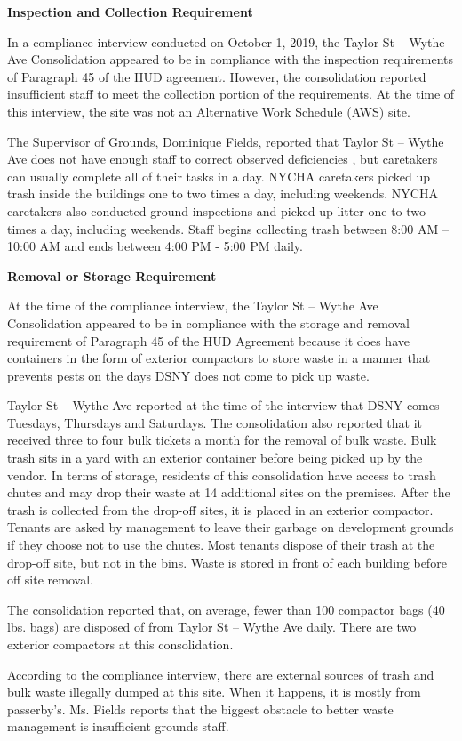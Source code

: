 

\textbf{Inspection and Collection Requirement}

In a compliance interview conducted on October 1, 2019, the Taylor St -- Wythe Ave Consolidation appeared to be in compliance with the inspection requirements of Paragraph 45 of the HUD agreement. However, the consolidation reported insufficient staff to meet the collection portion of the requirements. At the time of this interview, the site was not an Alternative Work Schedule (AWS) site. 

The Supervisor of Grounds, Dominique Fields, reported that Taylor St -- Wythe Ave does not have enough staff to correct observed deficiencies , but caretakers can usually complete all of their tasks in a day. NYCHA caretakers picked up trash inside the buildings one to two times a day, including weekends. NYCHA caretakers also conducted ground inspections and picked up litter one to two times a day, including weekends. Staff begins collecting trash between 8:00 AM -- 10:00 AM and ends between 4:00 PM - 5:00 PM daily. 

\textbf{Removal or Storage Requirement}

At the time of the compliance interview, the Taylor St -- Wythe Ave Consolidation appeared to be in compliance with the storage and removal requirement of Paragraph 45 of the HUD Agreement because it does have containers in the form of exterior compactors to store waste in a manner that prevents pests on the days DSNY does not come to pick up waste. 

Taylor St -- Wythe Ave reported at the time of the interview that DSNY comes Tuesdays, Thursdays and Saturdays. The consolidation also reported that it received three to four bulk tickets a month for the removal of bulk waste. Bulk trash sits in a yard with an exterior container before being picked up by the vendor. In terms of storage, residents of this consolidation have access to trash chutes and may drop their waste at 14 additional sites on the premises. After the trash is collected from the drop-off sites, it is placed in an exterior compactor. Tenants are asked by management to leave their garbage on development grounds if they choose not to use the chutes. Most tenants dispose of their trash at the drop-off site, but not in the bins. Waste is stored in front of each building before off site removal. 

The consolidation reported that, on average, fewer than 100 compactor bags (40 lbs. bags) are disposed of from Taylor St -- Wythe Ave daily. There are two exterior compactors at this consolidation.

According to the compliance interview, there are external sources of trash and bulk waste illegally dumped at this site. When it happens, it is mostly from passerby's. Ms. Fields reports that the biggest obstacle to better waste management is insufficient grounds staff.